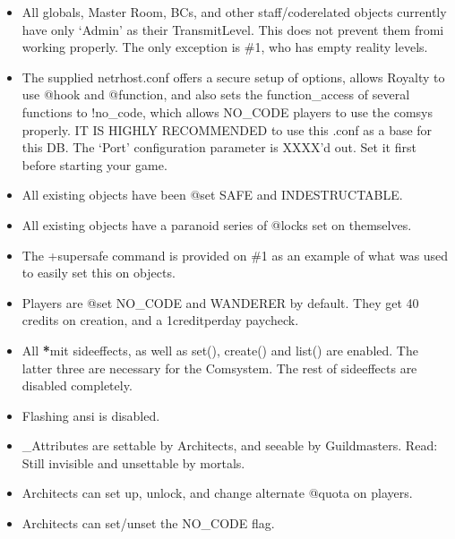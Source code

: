 \documentclass[letterpaper,10pt,english]{sphinxmanual}
\begin{document}
\begin{itemize}
\item {} 
\sphinxAtStartPar
All globals, Master Room, BCs\sphinxhyphen{}{\color{red}\bfseries{}*}, and other staff/code\sphinxhyphen{}related objects
currently have only ‘Admin’ as their Transmit\sphinxhyphen{}Level. This does not prevent
them fromi working properly. The only exception is \#1, who has empty reality
levels.

\item {} 
\sphinxAtStartPar
The supplied netrhost.conf offers a secure setup of options, allows Royalty
to use @hook and @function, and also sets the function\_access of several
functions to !no\_code, which allows NO\_CODE players to use the comsys
properly.
IT IS HIGHLY RECOMMENDED to use this .conf as a base for this DB.
The ‘Port’ configuration parameter is XXXX’d out. Set it first before starting
your game.

\item {} 
\sphinxAtStartPar
All existing objects have been @set SAFE and INDESTRUCTABLE.

\item {} 
\sphinxAtStartPar
All existing objects have a paranoid series of @locks set on themselves.

\item {} 
\sphinxAtStartPar
The +supersafe command is provided on \#1 as an example of what was used to
easily set this on objects.

\item {} 
\sphinxAtStartPar
Players are @set NO\_CODE and WANDERER by default. They get 40 credits on
creation, and a 1\sphinxhyphen{}credit\sphinxhyphen{}per\sphinxhyphen{}day paycheck.

\item {} 
\sphinxAtStartPar
All {\color{red}\bfseries{}*}mit sideeffects, as well as set(), create() and list() are enabled. The
latter three are necessary for the Comsystem. The rest of sideeffects are
disabled completely.

\item {} 
\sphinxAtStartPar
Flashing ansi is disabled.

\item {} 
\sphinxAtStartPar
\_Attributes are settable by Architects, and seeable by Guildmasters. Read:
Still invisible and unsettable by mortals.

\item {} 
\sphinxAtStartPar
Architects can set up, unlock, and change alternate @quota on players.

\item {} 
\sphinxAtStartPar
Architects can set/unset the NO\_CODE flag.


\end{itemize}
\end{document}
